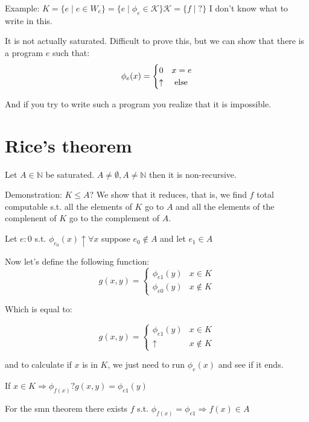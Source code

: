 \documentclass{amsbook}
\newcommand{\nat}{\ensuremath{\mathbb{N}}}
\theoremstyle{definition}
\theoremstyle{remark}
\numberwithin{section}{chapter}
\numberwithin{equation}{chapter}
\begin{document}
Example: $ K = \{e \mid e\in W_e \} = \{e \mid \phi_e\in \mathcal{K} \} \mathcal{K} = \{f \mid ? \}$ I don't know what to write in this.

It is not actually saturated. Difficult to prove this, but we can show that there is a program $e$ such that:
\begin{equation*}
	\phi_e(x) = \begin{cases}
		0        & x = e    \\
		\uparrow & $ else $
	\end{cases}
\end{equation*}

And if you try to write such a program you realize that it is impossible.

\section {Rice's theorem}
Let $ A \in \nat $ be saturated. $ A \not= \emptyset, A \not= \nat $ then it is non-recursive.

Demonstration: $ K \leq A $? We show that it reduces, that is, we find $f$ total computable s.t. all the elements of $K$ go to $A$ and all the elements of the complenent of $K$ go to the complement of $A$.

Let $ e:0 $ s.t. $ \phi_{e_0}(x)\uparrow\forall x $ suppose $ e_0\not\in A $ and let $ e_1\in A $

Now let's define the following function:
\begin{equation*}
	g(x,y) = \begin{cases}
		\phi_{e1}(y) & x \in K     \\
		\phi_{e0}(y) & x \not\in K
	\end{cases}
\end{equation*}

Which is equal to:

\begin{equation*}
	g(x,y) = \begin{cases}
		\phi_{e1}(y) & x \in K     \\
		\uparrow     & x \not\in K
	\end{cases}
\end{equation*}

and to calculate if $x$ is in $K$, we just need to run $ \phi_e(x) $ and see if it ends.

If $ x\in K \Rightarrow \phi_{f(x)} ? g(x,y) = \phi_{e1}(y)$

For the smn theorem there exists $f$ s.t. $ \phi_{f(x)} = \phi_{e1} \Rightarrow f(x)\in A$
\end{document}
